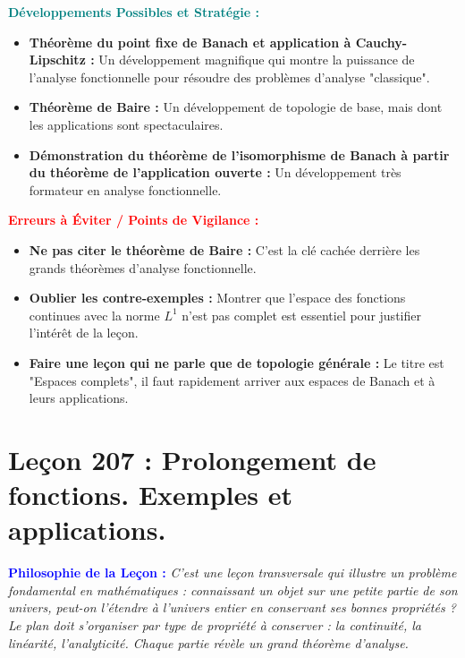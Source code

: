 \documentclass[12pt, a4paper, parskip=full]{report}
\theoremstyle{agregstyle}
\newenvironment{philosophie}
  {\par\medskip\noindent\begin{oframed}\noindent\textbf{\textcolor{blue}{Philosophie de la Leçon :}}\itshape}
  {\end{oframed}\par\medskip}
\newenvironment{developpements}
  {\par\medskip\noindent\begin{oframed}\noindent\textbf{\textcolor{teal}{Développements Possibles et Stratégie :}}}
  {\end{oframed}\par\medskip}
\newenvironment{erreurs}
  {\par\medskip\noindent\begin{oframed}\noindent\textbf{\textcolor{red}{Erreurs à Éviter / Points de Vigilance :}}}
  {\end{oframed}\par\medskip}
\begin{document}
\begin{developpements}
    \begin{itemize}
        \item \textbf{Théorème du point fixe de Banach et application à Cauchy-Lipschitz :} Un développement magnifique qui montre la puissance de l'analyse fonctionnelle pour résoudre des problèmes d'analyse "classique".
        \item \textbf{Théorème de Baire :} Un développement de topologie de base, mais dont les applications sont spectaculaires.
        \item \textbf{Démonstration du théorème de l'isomorphisme de Banach à partir du théorème de l'application ouverte :} Un développement très formateur en analyse fonctionnelle.
    \end{itemize}
\end{developpements}

\begin{erreurs}
    \begin{itemize}
        \item \textbf{Ne pas citer le théorème de Baire :} C'est la clé cachée derrière les grands théorèmes d'analyse fonctionnelle.
        \item \textbf{Oublier les contre-exemples :} Montrer que l'espace des fonctions continues avec la norme $L^1$ n'est pas complet est essentiel pour justifier l'intérêt de la leçon.
        \item \textbf{Faire une leçon qui ne parle que de topologie générale :} Le titre est "Espaces complets", il faut rapidement arriver aux espaces de Banach et à leurs applications.
    \end{itemize}
\end{erreurs}
\chapter{Leçon 207 : Prolongement de fonctions. Exemples et applications.}

\begin{philosophie}
    C'est une leçon transversale qui illustre un problème fondamental en mathématiques : connaissant un objet sur une petite partie de son univers, peut-on l'étendre à l'univers entier en conservant ses bonnes propriétés ? Le plan doit s'organiser par type de propriété à conserver : la continuité, la linéarité, l'analyticité. Chaque partie révèle un grand théorème d'analyse.
\end{philosophie}
\end{document}
